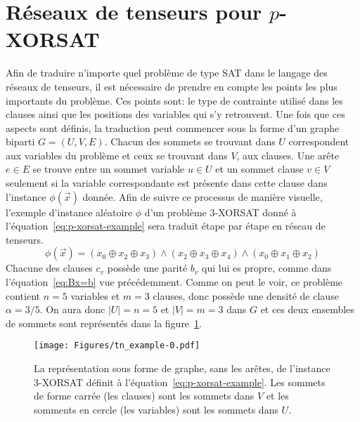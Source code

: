 \section{Réseaux de tenseurs pour \texorpdfstring{$p$}{p}-XORSAT}\label{sec:tn-for-p-xorsat}
Afin de traduire n'importe quel problème de type SAT dans le langage des réseaux de tenseurs, il est nécessaire de prendre en compte les points les plus importants du problème.
Ces points sont: le type de contrainte utilisé dans les clauses ainsi que les positions des variables qui s'y retrouvent.
Une fois que ces aspects sont définis, la traduction peut commencer sous la forme d'un graphe biparti $G = (U, V, E)$.
Chacun des sommets se trouvant dans $U$ correspondent aux variables du problème et ceux se trouvant dans $V$, aux clauses.
Une arête $e \in E$ se trouve entre un sommet variable $u \in U$ et un sommet clause $v \in V$ seulement si la variable correspondante est présente dans cette clause dans l'instance $\phi(\vec{x})$ donnée.
Afin de suivre ce processus de manière visuelle, l'exemple d'instance aléatoire $\phi$ d'un problème $3$-XORSAT donné à l'équation~\ref{eq:p-xorsat-example} sera traduit étape par étape en réseau de tenseurs.
\begin{equation}\label{eq:p-xorsat-example}
    \phi(\vec{x}) = (x_0 \oplus x_2 \oplus x_3) \wedge (x_2 \oplus x_3 \oplus x_4) \wedge (x_0 \oplus x_1 \oplus x_2)
\end{equation}
Chacune des clauses $c_v$ possède une parité $b_v$ qui lui es propre, comme dans l'équation~\ref{eq:Bx=b} vue précédemment.
Comme on peut le voir, ce problème contient $n = 5$ variables et $m = 3$ clauses, donc possède une densité de clause $\alpha = 3/5$.
On aura donc $|U| = n = 5$ et $|V| = m = 3$ dans $G$ et ces deux ensembles de sommets sont représentés dans la figure~\ref{fig:tn-example0}.
\begin{figure}[h]
    \centering
    \texttt{[image: Figures/tn\_example-0.pdf]}
    \caption[La représentation sous forme de graphe, sans les arêtes, de l'instance $3$-XORSAT définit à l'équation~\ref{eq:p-xorsat-example}.]{La représentation sous forme de graphe, sans les arêtes, de l'instance $3$-XORSAT définit à l'équation~\ref{eq:p-xorsat-example}. Les sommets de forme carrée (les clauses) sont les sommets dans $V$ et les somments en cercle (les variables) sont les sommets dans $U$.}
    \label{fig:tn-example0}
\end{figure}
